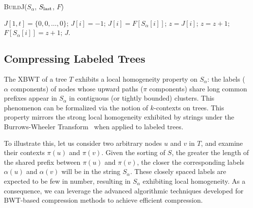 \begin{algorithm}[H]
    \caption{\textsc{BuildJ}($S_\alpha$, $S_{\textup{last}}$, $F$)}
    \begin{algorithmic}[1]
    \State $J[1,t]=\{0, 0, \dots, 0\}$;
            \State $J[i] = -1$; 
        \Else
            \State $J[i] = F[S_\alpha[i]]$;
            \State $z = J[i]$;
             
                \State $z = z + 1$;
            \EndWhile
            \State $F[S_\alpha[i]] = z + 1$;
        \EndIf
    \EndFor
    \State \Return $J$.
    \end{algorithmic}
\end{algorithm}

\subsection{Compressing Labeled Trees}

The XBWT of a tree $T$ exhibits a local homogeneity property on $S_{\alpha}$: the labels ($\alpha$ components) of nodes whose upward paths ($\pi$ components) share long common prefixes appear in $S_{\alpha}$ in contiguous (or tightly bounded) clusters. 
This phenomenon can be formalized via the notion of $k$-contexts on trees.
This property mirrors the strong local homogeneity exhibited by strings under the Burrows-Wheeler Transform~\cite{burrows1994block} when applied to labeled trees.

To illustrate this, let us consider two arbitrary nodes $u$ and $v$ in $T$, and examine their contexts $\pi(u)$ and $\pi(v)$. Given the sorting of $S$, the greater the length of the shared prefix between $\pi(u)$ and $\pi(v)$, the closer the corresponding labels $\alpha(u)$ and $\alpha(v)$ will be in the string $S_{\alpha}$. These closely spaced labels are expected to be few in number, resulting in $S_{\alpha}$ exhibiting local homogeneity. As a consequence, we can leverage the advanced algorithmic techniques developed for BWT-based compression methods to achieve efficient compression.

